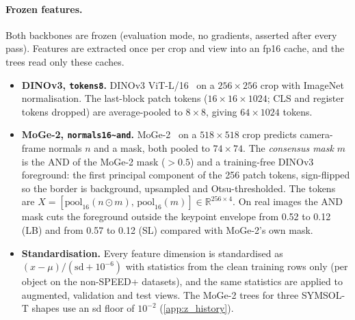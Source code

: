 \paragraph{Frozen features.}
Both backbones are frozen (evaluation mode, no gradients, asserted after every pass). Features are extracted once per crop and view into an fp16 cache, and the trees read only these caches.
\begin{itemize}
  \item \textbf{DINOv3, \texttt{tokens8}.} DINOv3 ViT-L/16~\cite{simeoni2025dinov3} on a $256\times256$ crop with ImageNet normalisation. The last-block patch tokens ($16\times16\times1024$; CLS and register tokens dropped) are average-pooled to $8\times8$, giving $64\times1024$ tokens.
  \item \textbf{MoGe-2, \texttt{normals16\textasciitilde and}.} MoGe-2~\cite{wang2025moge2} on a $518\times518$ crop predicts camera-frame normals $n$ and a mask, both pooled to $74\times74$. The \emph{consensus mask} $m$ is the AND of the MoGe-2 mask ($>0.5$) and a training-free DINOv3 foreground: the first principal component of the 256 patch tokens, sign-flipped so the border is background, upsampled and Otsu-thresholded. The tokens are $X=[\mathrm{pool}_{16}(n\odot m),\,\mathrm{pool}_{16}(m)]\in\mathbb{R}^{256\times4}$. On real images the AND mask cuts the foreground outside the keypoint envelope from 0.52 to 0.12 (LB) and from 0.57 to 0.12 (SL) compared with MoGe-2's own mask.
  \item \textbf{Standardisation.} Every feature dimension is standardised as $(x-\mu)/(\mathrm{sd}+10^{-6})$ with statistics from the clean training rows only (per object on the non-SPEED+ datasets), and the same statistics are applied to augmented, validation and test views. The MoGe-2 trees for three SYMSOL-T shapes use an sd floor of $10^{-2}$ (\cref{app:z_history}).
\end{itemize}

